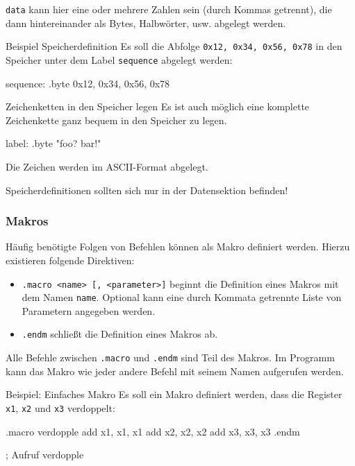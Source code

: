 \texttt{data} kann hier eine oder mehrere Zahlen sein (durch Kommas getrennt), die dann hintereinander als Bytes, Halbwörter, usw. abgelegt werden.

\begin{exampleblock}{Beispiel Speicherdefinition}
	Es soll die Abfolge \texttt{0x12, 0x34, 0x56, 0x78} in den Speicher unter dem Label \texttt{sequence} abgelegt werden:
	\begin{riscv}
		sequence: .byte 0x12, 0x34, 0x56, 0x78
	\end{riscv}
\end{exampleblock}

\begin{infoblock}{Zeichenketten in den Speicher legen}
	Es ist auch möglich eine komplette Zeichenkette ganz bequem in den Speicher zu legen.
	\begin{riscv}
		label: .byte "foo? bar!"
	\end{riscv}
	Die Zeichen werden im ASCII-Format abgelegt.
\end{infoblock}

\begin{warningblock}
	Speicherdefinitionen sollten sich nur in der Datensektion befinden!
\end{warningblock}

\subsubsection{Makros}

Häufig benötigte Folgen von Befehlen können als Makro definiert werden. Hierzu
existieren folgende Direktiven:

\begin{itemize}
	\item \texttt{.macro <name> [, <parameter>]} beginnt die Definition eines
	Makros mit dem Namen \texttt{name}. Optional kann eine durch Kommata getrennte Liste
	von Parametern angegeben werden.
	\item \texttt{.endm} schließt die Definition eines Makros ab.
\end{itemize}

Alle Befehle zwischen \texttt{.macro} und \texttt{.endm} sind Teil des Makros.
Im Programm kann das Makro wie jeder andere Befehl mit seinem Namen aufgerufen
werden.

\begin{exampleblock}{Beispiel: Einfaches Makro}
	Es soll ein Makro definiert werden, dass die Register \texttt{x1}, \texttt{x2}
	und \texttt{x3} verdoppelt:
	\begin{riscv}
		.macro verdopple
		add x1, x1, x1
		add x2, x2, x2
		add x3, x3, x3
		.endm

		; Aufruf
		verdopple
	\end{riscv}
\end{exampleblock}


